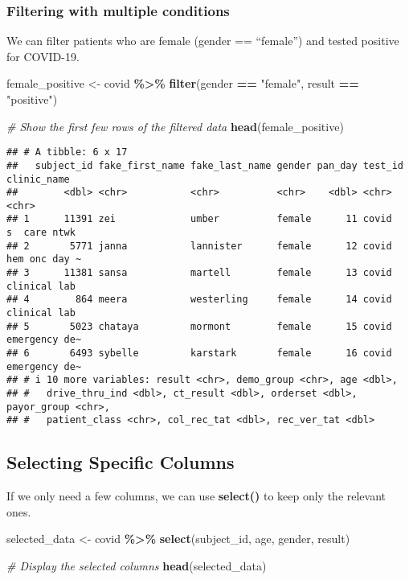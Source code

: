 \documentclass[
]{book}
\newenvironment{Shaded}{\begin{snugshade}}{\end{snugshade}}
\newcommand{\CommentTok}[1]{\textcolor[rgb]{0.56,0.35,0.01}{\textit{#1}}}
\newcommand{\FunctionTok}[1]{\textcolor[rgb]{0.13,0.29,0.53}{\textbf{#1}}}
\newcommand{\NormalTok}[1]{#1}
\newcommand{\OtherTok}[1]{\textcolor[rgb]{0.56,0.35,0.01}{#1}}
\newcommand{\SpecialCharTok}[1]{\textcolor[rgb]{0.81,0.36,0.00}{\textbf{#1}}}
\newcommand{\StringTok}[1]{\textcolor[rgb]{0.31,0.60,0.02}{#1}}
\begin{document}
\subsubsection{Filtering with multiple conditions}\label{filtering-with-multiple-conditions-1}

We can filter patients who are female (gender == ``female'') and tested positive for COVID-19.

\begin{Shaded}
\begin{Highlighting}[]
\NormalTok{female\_positive }\OtherTok{\textless{}{-}}\NormalTok{ covid }\SpecialCharTok{\%\textgreater{}\%}
  \FunctionTok{filter}\NormalTok{(gender }\SpecialCharTok{==} \StringTok{"female"}\NormalTok{, result }\SpecialCharTok{==} \StringTok{"positive"}\NormalTok{)}

\CommentTok{\# Show the first few rows of the filtered data}
\FunctionTok{head}\NormalTok{(female\_positive)}
\end{Highlighting}
\end{Shaded}

\begin{verbatim}
## # A tibble: 6 x 17
##   subject_id fake_first_name fake_last_name gender pan_day test_id clinic_name  
##        <dbl> <chr>           <chr>          <chr>    <dbl> <chr>   <chr>        
## 1      11391 zei             umber          female      11 covid   s  care ntwk 
## 2       5771 janna           lannister      female      12 covid   hem onc day ~
## 3      11381 sansa           martell        female      13 covid   clinical lab 
## 4        864 meera           westerling     female      14 covid   clinical lab 
## 5       5023 chataya         mormont        female      15 covid   emergency de~
## 6       6493 sybelle         karstark       female      16 covid   emergency de~
## # i 10 more variables: result <chr>, demo_group <chr>, age <dbl>,
## #   drive_thru_ind <dbl>, ct_result <dbl>, orderset <dbl>, payor_group <chr>,
## #   patient_class <chr>, col_rec_tat <dbl>, rec_ver_tat <dbl>
\end{verbatim}

\subsection{Selecting Specific Columns}\label{selecting-specific-columns}

If we only need a few columns, we can use \textbf{select()} to keep only the relevant ones.

\begin{Shaded}
\begin{Highlighting}[]
\NormalTok{selected\_data }\OtherTok{\textless{}{-}}\NormalTok{ covid }\SpecialCharTok{\%\textgreater{}\%}
  \FunctionTok{select}\NormalTok{(subject\_id, age, gender, result)}

\CommentTok{\# Display the selected columns}
\FunctionTok{head}\NormalTok{(selected\_data)}
\end{Highlighting}
\end{Shaded}
\end{document}
